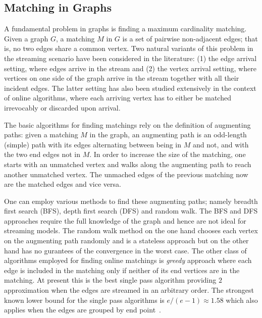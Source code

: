 \documentclass{scrartcl}
\begin{document}

%
%
%
\subsection{Matching in Graphs}
A fundamental problem in graphs is finding a maximum cardinality matching. Given a graph $G$, a matching $M$ in $G$ is a set of pairwise non-adjacent edges; that is, no two edges share a common vertex.
Two natural variants of this problem in the streaming scenario have been considered in the literature: (1) the edge
arrival setting, where edges arrive in the stream and (2) the vertex arrival setting, where vertices on one
side of the graph arrive in the stream together with all their incident edges.
The latter setting has also
been studied extensively in the context of online algorithms, where each arriving vertex has to either be
matched irrevocably or discarded upon arrival.

The basic algorithms for finding matchings rely on the definition of augmenting paths:
given a matching $M$ in the graph, an augmenting path is an odd-length
(simple) path with its edges alternating between being in $M$
and not, and with the two end edges not in $M$. In order to increase the size of the matching, one starts with an unmatched vertex and walks along the augmenting path to reach another unmatched vertex. The unmached edges of the previous matching now are the matched edges and vice versa.

One can employ various methods to find these augmenting paths; namely breadth first search (BFS), depth first search (DFS) and random walk. The BFS and DFS approaches require the full knowledge of the graph and hence are not ideal for streaming models. The random walk method on the one hand chooses each vertex on the augmenting path randomly and is a stateless approach but on the other hand has no gurantees of the convergence in the worst case.
The other class of algorithms employed for finding online matchings is \emph{greedy} approach where each edge is included in the matching only if neither of its end vertices are in the matching. At present this is the best single pass algorithm providing $2$ approximation when the edges are streamed in an arbitrary order. The strongest known lower bound for the single pass algorithms is $e/(e-1)\approx 1.58$ which also applies when the edges are grouped by end point~\cite{boundsKap,Goel}.
\end{document}
